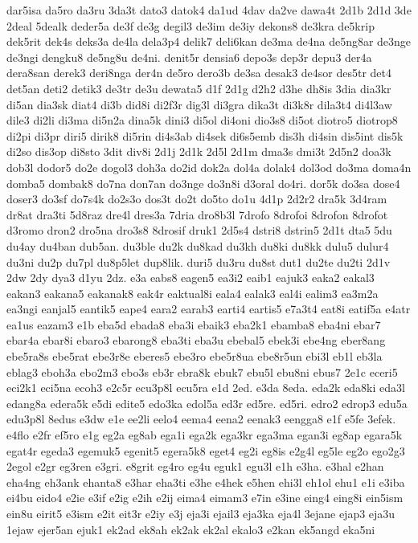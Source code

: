 {dar5isa da5ro da3ru 3da3t dato3 datok4 da1ud 4dav da2ve dawa4t 2d1b 2d1d
3de 2deal 5dealk deder5a de3f de3g degil3 de3im de3iy dekons8 de3kra
de5krip dek5rit dek4s deks3a de4la dela3p4 delik7 deli6kan de3ma de4na
de5ng8ar de3nge de3ngi dengku8 de5ng8u de4ni. denit5r densia6 depo3s dep3r
depu3 der4a dera8san derek3 deri8nga der4n de5ro dero3b de3sa desak3
de4sor des5tr det4 det5an deti2 detik3 de3tr de3u dewata5 d1f 2d1g d2h2
d3he dh8is 3dia dia3kr di5an dia3sk diat4 di3b did8i di2f3r dig3l di3gra
dika3t di3k8r dila3t4 di4l3aw dile3 di2li di3ma di5n2a dina5k dini3 di5ol
di4oni dio3s8 di5ot diotro5 diotrop8 di2pi di3pr diri5 dirik8 di5rin
di4s3ab di4sek di6s5emb dis3h di4sin dis5int dis5k di2so dis3op di8sto
3dit div8i 2d1j 2d1k 2d5l 2d1m dma3s dmi3t 2d5n2 doa3k dob3l dodor5 do2e
dogol3 doh3a do2id dok2a dol4a dolak4 dol3od do3ma doma4n domba5 dombak8
do7na don7an do3nge do3n8i d3oral do4ri. dor5k do3sa dose4 doser3 do3sf
do7s4k do2s3o dos3t do2t do5to do1u 4d1p 2d2r2 dra5k 3d4ram dr8at dra3ti
5d8raz dre4l dres3a 7dria dro8b3l 7drofo 8drofoi 8drofon 8drofot d3romo
dron2 dro5na dro3s8 8drosif druk1 2d5s4 dstri8 dstrin5 2d1t dta5 5du du4ay
du4ban dub5an. du3ble du2k du8kad du3kh du8ki du8kk dulu5 dulur4 du3ni
du2p du7pl du8p5let dup8lik. duri5 du3ru du8st dut1 du2te du2ti 2d1v 2dw
2dy dya3 d1yu 2dz. e3a eabs8 eagen5 ea3i2 eaib1 eajuk3 eaka2 eakal3 eakan3
eakana5 eakanak8 eak4r eaktual8i eala4 ealak3 eal4i ealim3 ea3m2a ea3ngi
eanjal5 eantik5 eape4 eara2 earab3 earti4 eartis5 e7a3t4 eat8i eatif5a
e4atr ea1us eazam3 e1b eba5d ebada8 eba3i ebaik3 eba2k1 ebamba8 eba4ni
ebar7 ebar4a ebar8i ebaro3 ebarong8 eba3ti eba3u ebebal5 ebek3i ebe4ng
eber8ang ebe5ra8s ebe5rat ebe3r8e eberes5 ebe3ro ebe5r8ua ebe8r5un ebi3l
eb1l eb3la eblag3 eboh3a ebo2m3 ebo3s eb3r ebra8k ebuk7 ebu5l ebu8ni ebus7
2e1c eceri5 eci2k1 eci5na ecoh3 e2c5r ecu3p8l ecu5ra e1d 2ed. e3da 8eda.
eda2k eda8ki eda3l edang8a edera5k e5di edite5 edo3ka edol5a ed3r ed5re.
ed5ri. edro2 edrop3 edu5a edu3p8l 8edus e3dw e1e ee2li eelo4 eema4 eena2
eenak3 eengga8 e1f e5fe 3efek. e4flo e2fr ef5ro e1g eg2a eg8ab ega1i ega2k
ega3kr ega3ma egan3i eg8ap egara5k egat4r egeda3 egemuk5 egenit5 egera5k8
eget4 eg2i eg8is e2g4l eg5le eg2o ego2g3 2egol e2gr eg3ren e3gri. e8grit
eg4ro eg4u eguk1 egu3l e1h e3ha. e3hal e2han eha4ng eh3ank ehanta8 e3har
eha3ti e3he e4hek e5hen ehi3l eh1ol ehu1 e1i e3iba ei4bu eido4 e2ie e3if
e2ig e2ih e2ij eima4 eimam3 e7in e3ine eing4 eing8i ein5ism ein8u eirit5
e3ism e2it eit3r e2iy e3j eja3i ejail3 eja3ka eja4l 3ejane ejap3 eja3u
1ejaw ejer5an ejuk1 ek2ad ek8ah ek2ak ek2al ekalo3 e2kan ek5angd eka5ni
}
